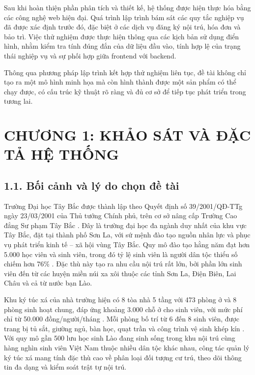 \documentclass[12pt]{article}
\begin{document}
Sau khi hoàn thiện phần phân tích và thiết kế, hệ thống được hiện thực hóa bằng các công nghệ web hiện đại. Quá trình lập trình bám sát các quy tắc nghiệp vụ đã được xác định trước đó, đặc biệt ở các dịch vụ đăng ký nội trú, hóa đơn và bảo trì. Việc thử nghiệm được thực hiện thông qua các kịch bản sử dụng điển hình, nhằm kiểm tra tính đúng đắn của dữ liệu đầu vào, tính hợp lệ của trạng thái nghiệp vụ và sự phối hợp giữa frontend với backend.

Thông qua phương pháp lập trình kết hợp thử nghiệm liên tục, đề tài không chỉ tạo ra một mô hình minh họa mà còn hình thành được một sản phẩm có thể chạy được, có cấu trúc kỹ thuật rõ ràng và đủ cơ sở để tiếp tục phát triển trong tương lai.

\newpage
\section*{CHƯƠNG 1: KHẢO SÁT VÀ ĐẶC TẢ HỆ THỐNG}

\subsection*{1.1. Bối cảnh và lý do chọn đề tài}

Trường Đại học Tây Bắc được thành lập theo Quyết định số 39/2001/QĐ-TTg ngày 23/03/2001 của Thủ tướng Chính phủ, trên cơ sở nâng cấp Trường Cao đẳng Sư phạm Tây Bắc \cite{utb_history}. Đây là trường đại học đa ngành duy nhất của khu vực Tây Bắc, đặt tại thành phố Sơn La, với sứ mệnh đào tạo nguồn nhân lực và phục vụ phát triển kinh tế -- xã hội vùng Tây Bắc. Quy mô đào tạo hằng năm đạt hơn 5.000 học viên và sinh viên, trong đó tỷ lệ sinh viên là người dân tộc thiểu số chiếm hơn 76\% \cite{utb_khaigiang2024}. Đặc thù này tạo ra nhu cầu nội trú rất lớn, bởi phần lớn sinh viên đến từ các huyện miền núi xa xôi thuộc các tỉnh Sơn La, Điện Biên, Lai Châu và cả từ nước bạn Lào.

Khu ký túc xá của nhà trường hiện có 8 tòa nhà 5 tầng với 473 phòng ở và 8 phòng sinh hoạt chung, đáp ứng khoảng 3.000 chỗ ở cho sinh viên, với mức phí chỉ từ 50.000 đồng/người/tháng \cite{utb_ktx}. Mỗi phòng bố trí từ 6 đến 8 sinh viên, được trang bị tủ sắt, giường ngủ, bàn học, quạt trần và công trình vệ sinh khép kín \cite{utb_phong_ktu}. Với quy mô gần 500 lưu học sinh Lào đang sinh sống trong khu nội trú cùng hàng nghìn sinh viên Việt Nam thuộc nhiều dân tộc khác nhau, công tác quản lý ký túc xá mang tính đặc thù cao về phân loại đối tượng cư trú, theo dõi thông tin đa dạng và kiểm soát trật tự nội trú.
\end{document}
